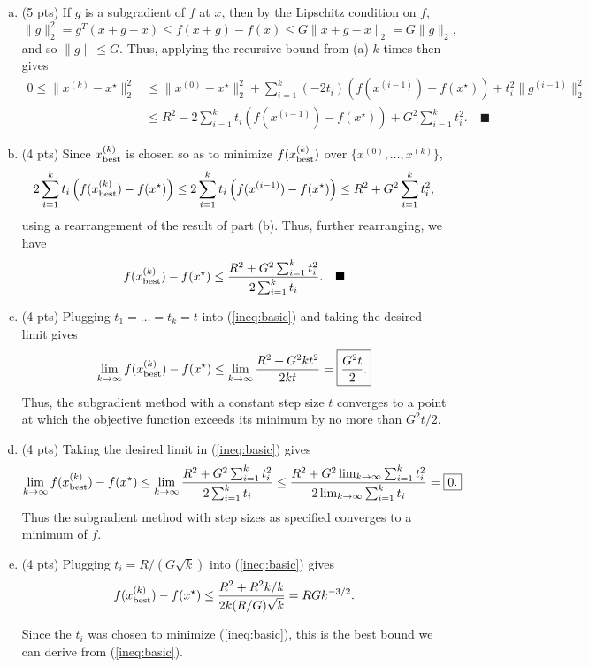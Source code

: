 \documentclass[11pt]{article}
\newcommand{\qed}{\quad \ensuremath{\blacksquare}}      %
\begin{document}
\begin{enumerate}[(a)]
\item (5 pts) If $g$ is a subgradient of $f$ at $x$, then by the Lipschitz
condition on $f$,
\begin{equation}
\|g\|_2^2
    = g^T(x + g - x)
    \leq f(x + g) - f(x)
    \leq G\|x + g - x\|_2 = G\|g\|_2,
\end{equation}
and so $\|g\| \leq G$. Thus, applying the recursive bound from (a) $k$ times
then gives
\begin{align*}
0   \leq \|x^{(k)} - x^\star\|_2^2
  & \leq \|x^{(0)} - x^\star\|_2^2
    + \sum_{i = 1}^k (-2t_i)\left(f(x^{(i - 1)}) - f(x^\star)\right)
    + t_i^2\|g^{(i - 1)}\|_2^2  \\
  & \leq R^2
    -2\sum_{i = 1}^k t_i\left(f(x^{(i - 1)}) - f(x^\star)\right)
    + G^2\sum_{i = 1}^k t_i^2. \qed
\end{align*}
\def \best {\ensuremath{_{\mbox{\scriptsize best}}}}
\item (4 pts) Since $x^{(k)}\best$ is chosen so as to minimize
$f(x^{(k)}\best)$ over $\{x^{(0)},\dots,x^{(k)}\}$,
\[2\sum_{i = 1}^k t_i\left(f(x^{(k)}\best) - f(x^\star)\right)
    \leq 2\sum_{i = 1}^k t_i\left(f(x^{(i - 1)}) - f(x^\star)\right)
    \leq R^2 + G^2\sum_{i = 1}^k t_i^2,\]
using a rearrangement of the result of part (b). Thus, further rearranging, we
have
\begin{equation}
\label{ineq:basic}
f(x^{(k)}\best) - f(x^\star)
\leq \frac{R^2 + G^2\sum_{i = 1}^k t_i^2}{2\sum_{i = 1}^k t_i}. \qed
\end{equation}

\item (4 pts) Plugging $t_1 = \dots = t_k = t$ into (\ref{ineq:basic}) and
taking the desired limit gives
\[
\lim_{k \to \infty} f(x^{(k)}\best) - f(x^\star)
    \leq \lim_{k \to \infty} \frac{R^2 + G^2kt^2}{2kt}
    = \mbox{\fbox{$\displaystyle \frac{G^2t}{2}$.}}
\]
Thus, the subgradient method with a constant step size $t$ converges to a point
at which the objective function exceeds its minimum by no more than $G^2t/2$.

\item (4 pts) Taking the desired limit in (\ref{ineq:basic}) gives
\[
\lim_{k \to \infty} f(x^{(k)}\best) - f(x^\star)
    \leq \lim_{k \to \infty} \frac{R^2 + G^2\sum_{i = 1}^k t_i^2}
                                  {2\sum_{i = 1}^k t_i}
    \leq \frac{R^2 + G^2\lim_{k \to \infty} \sum_{i = 1}^k t_i^2}
                                  {2\lim_{k \to \infty} \sum_{i = 1}^k t_i}
    = \mbox{\fbox{$0$.}}
\]
Thus the subgradient method with step sizes as specified converges to a minimum
of $f$.

\item (4 pts) Plugging $t_i = R/(G\sqrt k)$ into (\ref{ineq:basic}) gives
\begin{equation}
\label{ineq:tightestbound}
f(x^{(k)}\best) - f(x^\star)
    \leq \frac{R^2 + R^2k/k}{2k(R/G)\sqrt k}
    = RG k^{-3/2}.
\end{equation}

Since the $t_i$ was chosen to minimize (\ref{ineq:basic}), this is the best
bound we can derive from (\ref{ineq:basic}).
\end{enumerate}
\end{document}
